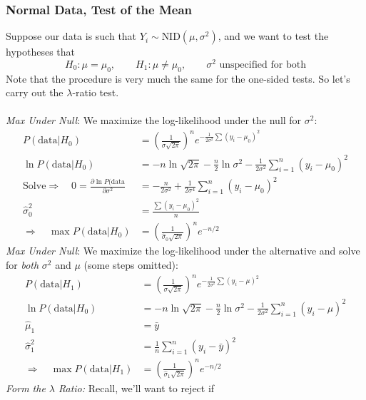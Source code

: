 \documentclass[a4paper,12pt]{scrartcl}
\begin{document}
\subsubsection{Normal Data, Test of the Mean}

Suppose our data is such that $Y_i \sim $NID$(\mu,\sigma^2)$, and
we want to test the hypotheses that
   \[ H_0: \mu = \mu_0, \qquad H_1: \mu \neq \mu_0, \qquad
      \text{$\sigma^2$ unspecified for both} \]
Note that the procedure is very much the same for the one-sided
tests. So let's carry out the $\lambda$-ratio test.
\\
\\
{\sl Max Under Null}: We maximize the log-likelihood under the null
for $\sigma^2$:
\begin{align*}
   P(\text{data} | H_0) &= \left(\frac{1}{\sigma\sqrt{2\pi}}\right)^n
      e^{-\frac{1}{2\sigma^2} \sum (y_i - \mu_0)^2 } \\
   \ln P(\text{data} | H_0) &= - n \ln \sqrt{2\pi}
      -\frac{n}{2} \ln \sigma^2 - \frac{1}{2\sigma^2}
      \sum_{i=1}^n (y_i - \mu_0)^2 \\
   \text{Solve} \Rightarrow \quad 0=
      \frac{\partial \ln P(\text{data}}{\partial
      \sigma^2} &= -\frac{n}{2\sigma^2} + \frac{1}{2\sigma^4}
      \sum_{i=1}^n (y_i - \mu_0)^2 \\
   \hat{\sigma}^2_0 &= \frac{\sum (y_i - \mu_0)^2}{n}\\
   \Rightarrow\quad \max P(\text{data} | H_0) &=
      \left(\frac{1}{\hat{\sigma}_0 \sqrt{2\pi}} \right)^n
	 e^{-n/2}
\end{align*}
{\sl Max Under Null}: We maximize the log-likelihood under the
alternative and solve for \emph{both} $\sigma^2$ and $\mu$ (some steps
omitted):
\begin{align*}
   P(\text{data} | H_1) &= \left(\frac{1}{\sigma\sqrt{2\pi}}\right)^n
      e^{-\frac{1}{2\sigma^2} \sum (y_i - \mu)^2 } \\
   \ln P(\text{data} | H_0) &= - n \ln \sqrt{2\pi}
      -\frac{n}{2} \ln \sigma^2 - \frac{1}{2\sigma^2}
      \sum_{i=1}^n (y_i - \mu)^2 \\
   \hat{\mu}_1 &= \bar{y}\\
   \hat{\sigma}^2_1 &= \frac{1}{n} \sum^n_{i=1} (y_i - \bar{y})^2\\
   \Rightarrow \quad \max P(\text{data} | H_1) &=
      \left(\frac{1}{\hat{\sigma}_1 \sqrt{2\pi}} \right)^n
      e^{-n/2}
\end{align*}
\newpage
{\sl Form the $\lambda$ Ratio:} Recall, we'll want to reject if
\end{document}
